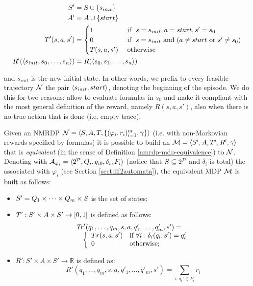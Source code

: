 \begin{gather}
	\begin{split}
	S' &= S\cup \{s_{init}\}\\
	A' &= A\cup \{start\}\\
	T'(s,a,s')  &=  \begin{cases}
			1 & \ \text{if\ }\  s=s_{init}, a=start, s'=s_0\\
			0 & \ \text{if\ }\  s=s_{init} \ \text{and}\  (a\neq start \ \text{or}\  s'\neq s_0)\\
			T(s, a, s') &  \ \text{otherwise}\ \\
		\end{cases}\\
	R'(\langle s_{init}, s_0, \dots, s_n \rangle) &= R(\langle s_0, s_1, \dots, s_n \rangle)
	\end{split}
	\label{def:nmrdp-with-dummy-initial-state}
\end{gather}

and $s_{init}$ is the new initial state. In other words, we prefix to every feasible trajectory $\mathcal{N}$ the pair $\langle s_{init}, start \rangle$, denoting the beginning of the episode. 
We do this for two reasons: allow to evaluate formulas in $s_0$ and make it compliant with the most general definition of the reward, namely $R(s, a, s')$, also when there is no true action that is done (i.e. empty trace).

\begin{definition}\label{nmrdp-mdp-transformation-brafman}
	Given an NMRDP $\mathcal{N} = \langle S, A, T, \{(\varphi_i, r_i)^m_{i=1}, \gamma\} \rangle$ (i.e. with non-Markovian rewards specified by \LLf formulas) it is possible to build an  $\mathcal{M} = \langle S', A, T', R', \gamma \rangle$ that is \emph{equivalent} (in the sense of Definition \ref{nmrdp-mdp-equivalence}) to $\mathcal{N}$. Denoting with 
	$\mathcal{A}_{\varphi_i} = \langle 2^{\mathcal{P}}, Q_i, q_{i0}, \delta_i,F_i \rangle$ (notice that $S\subseteq 2^{\mathcal{P}}$ and $\delta_i$ is total) the \DFA associated 
	with $\varphi_i$ (see Section \ref{sect:llf2automata}), the equivalent MDP $\mathcal{M}$ is built as follows:
	\begin{itemize}
		\itemsep=0mm
		\item $S'=Q_1\times\cdots\times Q_m\times S$ is the set of states;
		\item $T' : S'\times A \times S'\rightarrow [0,1]$ is defined as follows:
		\[
		\begin{array}{l}
		\mathit{Tr}'(q_1,\ldots,q_m, s, a, q'_1,\ldots,q'_m, s') = {}\\
		\quad\left\{
		\begin{array}{ll}\label{tr-fun-expanded-mdp}
			Tr(s,a,s') &\mbox{if } \forall i:\delta_i(q_i,s') = q'_i\\
			0 & \mbox{otherwise}; 
			\end{array}\right.
		\end{array}
		\] 
		\item $R': S'\times A \times S'\rightarrow 
		\mathbb{R}$ is defined as:
		\[
		R'(q_1,\ldots,q_m, s, a, q'_1,\ldots,q'_m, s') = 
		\sum_{i: q_i'\in F_i} r_i
		\] 
	\end{itemize}
\end{definition}


